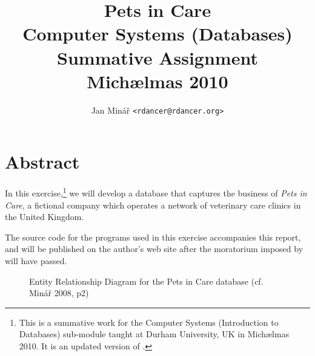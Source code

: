 \documentclass[10pt]{report}
\author{Jan Minář {\tt <rdancer@rdancer.org>}}
\title{Pets in Care\\Computer Systems (Databases)\\Summative Assignment\\Michælmas 2010}
\begin{document}


\maketitle



\chapter{Abstract}
\thispagestyle{fancy}

In this exercise,\footnote{This is a summative work for the Computer Systems (Introduction to Databases) sub-module taught at Durham University, UK in Michælmas 2010.  It is an updated version of \cite{minarcsys}.} we will develop a database that captures the business of {\em Pets in Care}, a fictional company which operates a network of veterinary care clinics in the United Kingdom.

The source code for the programs used in this exercise accompanies this report, and will be published on the author's web site after the moratorium imposed by \cite{plagiarism} will have passed.

\begin{figure}
    \centering
    \caption{
	Entity Relationship Diagram for the Pets in Care database (cf. Minář 2008, p2)
    }
    \label{flowchart}
\end{figure}
\end{document}
